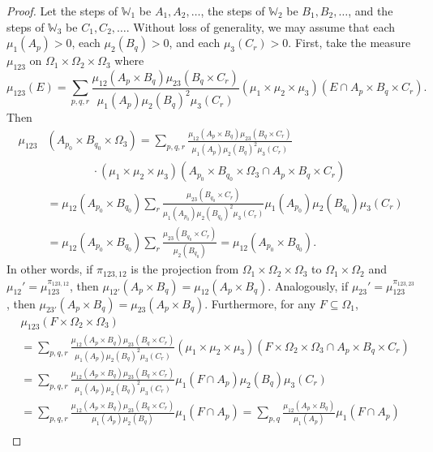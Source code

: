 \documentclass{amsart}
\numberwithin{equation}{section}
\numberwithin{figure}{section}
\theoremstyle{definition}
\theoremstyle{remark}
\newcommand{\cW}{\mathbb{W}}
\begin{document}
\begin{proof}
Let the steps of $\cW_1$ be $A_1,A_2,\dots$, the steps of $\cW_2$ be
$B_1,B_2,\dots$, and the steps of $\cW_3$ be $C_1,C_2,\dots$. Without loss of
generality, we may assume that each $\mu_1(A_p)>0$, each $\mu_2(B_q)>0$, and
each $\mu_3(C_r)>0$.
First, take the measure
$\mu_{123}$ on $\Omega_1 \times\Omega_2 \times \Omega_3$ where
\[
{\mu_{123}}(E) =\sum_{p,q,r}\frac{\mu_{12}(A_p \times B_q)\mu_{23}(B_q \times
C_r)}{\mu_1(A_p)\mu_2(B_q)^2 \mu_3(C_r)} \left(\mu_1 \times \mu_2 \times
\mu_3\right)(E \cap A_p \times B_q \times C_r) .\] Then
\begin{align*}
\mu_{123}&(A_{p_0} \times B_{q_0} \times \Omega_3)=
\sum_{p,q,r}\frac{\mu_{12}(A_p \times B_q)\mu_{23}(B_q \times C_r)}{\mu_1(A_p)\mu_2(B_q)^2 \mu_3(C_r)}
\\&\qquad \qquad \phantom{} \cdot
\left(\mu_1 \times \mu_2 \times \mu_3\right)(A_{p_0}\times B_{q_0} \times \Omega_3 \cap A_p \times B_q \times C_r)
\\
&= \mu_{12}(A_{p_0} \times B_{q_0}) \sum_r \frac{\mu_{23}(B_{q_0} \times C_r)}{\mu_1(A_{p_0})\mu_2(B_{q_0})^2\mu_3(C_r)}
\mu_1(A_{p_0})\mu_2(B_{q_0})\mu_3(C_r)\\
&= \mu_{12}(A_{p_0} \times B_{q_0}) \sum_r \frac{\mu_{23}(B_{q_0} \times C_r)}{\mu_2(B_{q_0})}
= \mu_{12}(A_{p_0} \times B_{q_0}) .
\end{align*}
In other words, if $\pi_{123,12}$ is the projection from
$\Omega_1\times\Omega_2\times\Omega_3$ to $\Omega_1\times\Omega_2$ and
$\mu_{12}'=\mu_{123}^{\pi_{123,12}}$, then $\mu_{12'}(A_p \times
B_q)=\mu_{12}(A_p\times B_q)$. Analogously, if
$\mu_{23}'=\mu_{123}^{\pi_{123,23}}$, then $\mu_{23'}(A_p \times
B_q)=\mu_{23}(A_p\times B_q)$. Furthermore, for any $F \subseteq \Omega_1$,
\begin{align*}
&\mu_{123}(F \times \Omega_2 \times \Omega_3)\\
&=\sum_{p,q,r}\frac{\mu_{12}(A_p \times B_q)\mu_{23}(B_q \times C_r)}{\mu_1(A_p)\mu_2(B_q)^2 \mu_3(C_r)} \left(\mu_1 \times \mu_2 \times \mu_3\right)(F\times \Omega_2 \times \Omega_3 \cap A_p \times B_q \times C_r)\\
&=\sum_{p,q,r}\frac{\mu_{12}(A_p \times B_q)\mu_{23}(B_q \times C_r)}{\mu_1(A_p)\mu_2(B_q)^2 \mu_3(C_r)} \mu_1(F \cap A_p) \mu_2(B_q) \mu_3(C_r)\\
&=\sum_{p,q,r}\frac{\mu_{12}(A_p \times B_q)\mu_{23}(B_q \times C_r)}{\mu_1(A_p)\mu_2(B_q)} \mu_1(F \cap A_p)
=\sum_{p,q}\frac{\mu_{12}(A_p \times B_q)}{\mu_1(A_p)} \mu_1(F \cap A_p)
\\&

\end{align*}
\end{proof}
\end{document}

